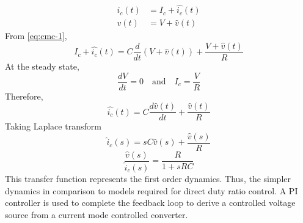 	\begin{align}
		i_c(t) &= I_c + \hat{i_c}(t)\\
		v(t) &= V + \hat{v}(t)
		\label{eq:cmc-2}
	\end{align}
	From \eqref{eq:cmc-1},
	\begin{equation}
		I_c + \hat{i_c}(t) = C\dfrac{d}{dt}(V + \hat{v}(t)) + \dfrac{V + \hat{v}(t)}{R}
		\label{eq:cmc-3}
	\end{equation}
	At the steady state, 
	\begin{equation}
		\dfrac{dV}{dt} = 0 \quad \text{and} \quad I_c = \dfrac{V}{R}
		\label{eq:cmc-4}
	\end{equation}
	Therefore,
	\begin{equation}
		\hat{i_c}(t) = C\dfrac{d\hat{v}(t)}{dt} + \dfrac{\hat{v}(t)}{R}
		\label{eq:cmc-5}
	\end{equation}
	Taking Laplace transform
	\begin{equation}
		\hat{i}_c(s) = sC\hat{v}(s) + \dfrac{\hat{v}(s)}{R}
	\end{equation}
	\begin{equation}
		\dfrac{\hat{v}(s)}{\hat{i}_c(s)} = \dfrac{R}{1+sRC}
	\end{equation}
	This transfer function represents the first order dynamics. Thus, the simpler dynamics in comparison to models required for direct duty ratio control. A PI controller is used to complete the feedback loop to derive a controlled voltage source from a current mode controlled converter.
	
